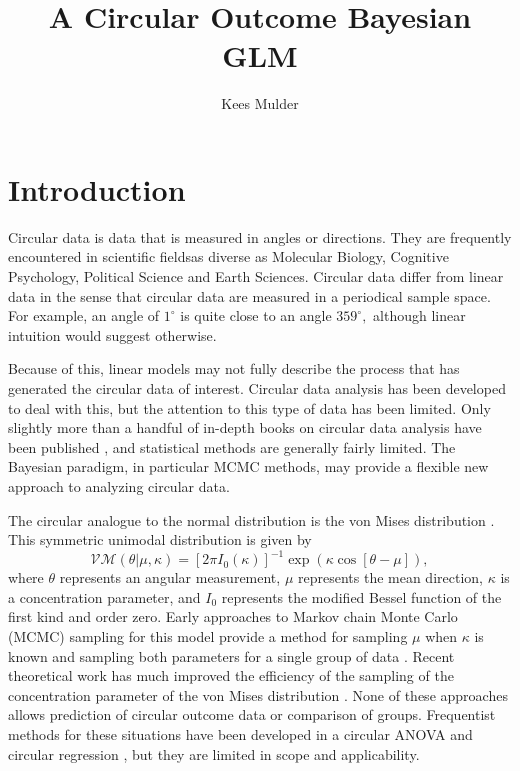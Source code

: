 \documentclass[12pt,a4paper]{article}
\author{Kees Mulder}
\title{A Circular Outcome Bayesian GLM}
\begin{document}
\maketitle

\section{Introduction}

Circular data is data that is measured in angles or directions. They are frequently encountered in scientific fieldsas diverse as Molecular Biology, Cognitive Psychology, Political Science \citep{gill2010} and Earth Sciences. Circular data differ from linear data in the sense that circular data are measured in a periodical sample space. For example, an angle of $1^{\circ}$ is quite close to an angle $359^{\circ},$ although linear intuition would suggest otherwise. 

Because of this, linear models may not fully describe the process that has generated the circular data of interest. Circular data analysis has been developed to deal with this, but the attention to this type of data has been limited. Only slightly more than a handful of in-depth books on circular data analysis have been published \citep{fisher1995statistical,mardia1999directional,pewsey2013circular}, and statistical methods are generally fairly limited. The Bayesian paradigm, in particular MCMC methods, may provide a flexible new approach to analyzing circular data. 

The circular analogue to the normal distribution is the von Mises distribution \citep{von1918ganzzahligkeit}. This symmetric unimodal distribution is given by
\begin{equation}
\mathcal{VM}(\theta \vert \mu, \kappa) = \left[ 2 \pi I_0(\kappa) \right]^{-1} 
\exp \left( \kappa \cos \left[ \theta - \mu \right] \right),
\end{equation}
where $\theta$ represents an angular measurement, $\mu$ represents the mean direction, $\kappa$ is a concentration parameter, and $I_0$ represents the modified Bessel function of the first kind and order zero. Early approaches to Markov chain Monte Carlo (MCMC) sampling for this model provide a method for sampling $\mu$ when $\kappa$ is known \citep{mardia1976bayesian} and sampling both parameters for a single group of data \citep{damien1999fullbayes}. Recent theoretical work has much improved the efficiency of the sampling of the concentration parameter of the von Mises distribution \citep{forbes2014fast}. None of these approaches allows prediction of circular outcome data or comparison of groups. Frequentist methods for these situations have been developed in a circular ANOVA \citep{harrison1986analysis,harrison1988development} and circular regression \citep{fisher1992regression}, but they are limited in scope and applicability. 
\end{document}
